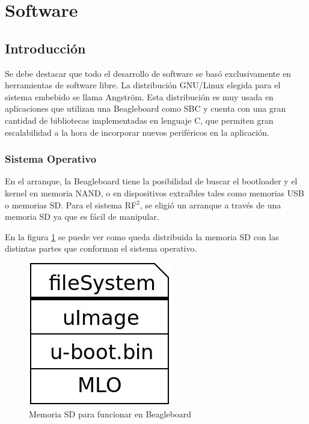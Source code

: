 \documentclass[%
        final,
        notitlepage,
        narroweqnarray,
        inline,
        ]{ieee}
\begin{document}
\section{Software}

\subsection{Introducción}
Se debe destacar que todo el desarrollo de software se basó exclusivamente en herramientas de software libre. La distribución GNU/Linux elegida para el sistema embebido se llama Angström. Esta distribución es muy usada en aplicaciones que utilizan una Beagleboard como SBC y cuenta con una gran cantidad de bibliotecas implementadas en lenguaje C, que permiten gran escalabilidad a la hora de incorporar nuevos periféricos en la aplicación.


\subsubsection{Sistema Operativo}
En el arranque, la Beagleboard tiene la posibilidad de buscar el bootloader y el kernel en memoria NAND, o en dispositivos extraíbles tales como memorias USB o memorias SD. Para el sistema RF$^{2}$, se eligió un arranque a través de una memoria SD ya que es fácil de manipular.

En la figura \ref{Fig:SD} se puede ver como queda distribuida la memoria SD con las distintas partes
que conforman el sistema operativo. 

\begin{figure}[h]
\centering
  \begin{center}
  \includegraphics[scale=.4]{../docs/Imagenes/sd.jpg} 
  \end{center}
  \caption{Memoria SD para funcionar en Beagleboard}\label{Fig:SD} 
\end{figure}
\end{document}

